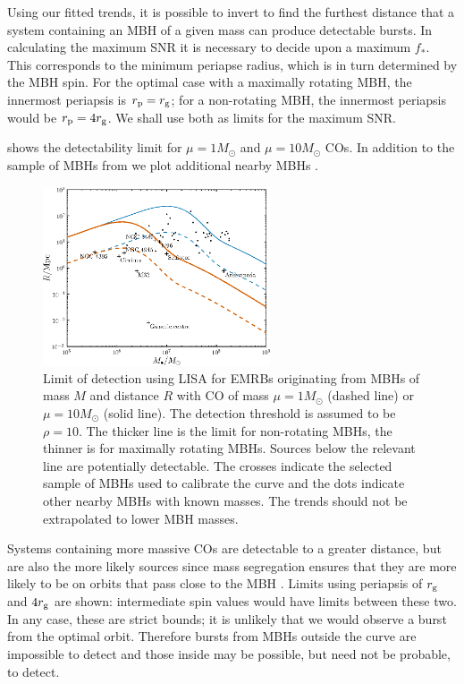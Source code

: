 Using our fitted trends, it is possible to invert  to find the furthest distance that a system containing an MBH of a given mass can produce detectable bursts. In calculating the maximum SNR it is necessary to decide upon a maximum $f_\ast$. This corresponds to the minimum periapse radius, which is in turn determined by the MBH spin. For the optimal case with a maximally rotating MBH, the innermost periapsis is $r_\mathrm{p} = r_\mathrm{g}$; for a non-rotating MBH, the innermost periapsis would be $r_\mathrm{p} = 4r_\mathrm{g}$. We shall use both as limits for the maximum SNR.

 shows the detectability limit for $\mu = 1 M_\odot$ and $\mu = 10 M_\odot$ COs. In addition to the sample of MBHs from  we plot additional nearby MBHs \citep[see][and references therein]{Graham2008,Graham2011,Graham2013}. 
\begin{figure}
\centering
 \includegraphics[width=0.6\textwidth]{./images/Fig_M_R_detect_1}
 \caption{Limit of detection using LISA for EMRBs originating from MBHs of mass $M$ and distance $R$ with CO of mass $\mu = 1 M_\odot$ (dashed line) or $\mu = 10 M_\odot$ (solid line). The detection threshold is assumed to be $\rho = 10$. The thicker line is the limit for non-rotating MBHs, the thinner is for maximally rotating MBHs. Sources below the relevant line are potentially detectable. The crosses indicate the selected sample of MBHs used to calibrate the curve and the dots indicate other nearby MBHs with known masses. The trends should not be extrapolated to lower MBH masses.}
 \label{fig:detect}
\end{figure}
Systems containing more massive COs are detectable to a greater distance, but are also the more likely sources since mass segregation ensures that they are more likely to be on orbits that pass close to the MBH \citep{Bahcall1977, Alexander2009, Preto2010}. Limits using periapsis of $r_\mathrm{g}$ and $4r_\mathrm{g}$ are shown: intermediate spin values would have limits between these two. In any case, these are strict bounds; it is unlikely that we would observe a burst from the optimal orbit. Therefore bursts from MBHs outside the curve are impossible to detect and those inside may be possible, but need not be probable, to detect.

